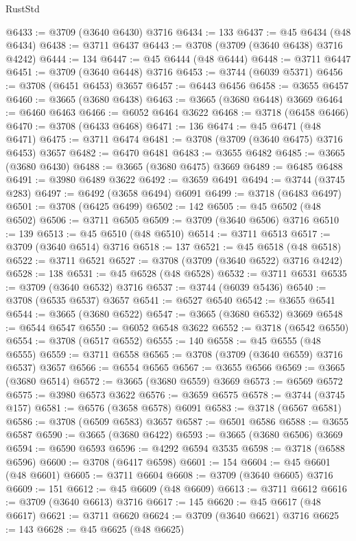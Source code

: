 \begin{lexlean}{RustStd}
\begin{coremodule}
@6433 := @3709 (@3640 @6430) @3716
@6434 := 133
@6437 := @45 @6434 (@48 @6434)
@6438 := @3711 @6437
@6443 := @3708 (@3709 (@3640 @6438) @3716 @4242)
@6444 := 134
@6447 := @45 @6444 (@48 @6444)
@6448 := @3711 @6447
@6451 := @3709 (@3640 @6448) @3716
@6453 := @3744 (@6039 @5371)
@6456 := @3708 (@6451 @6453) @3657
@6457 := @6443 @6456
@6458 := @3655 @6457
@6460 := @3665 (@3680 @6438)
@6463 := @3665 (@3680 @6448) @3669
@6464 := @6460 @6463
@6466 := @6052 @6464 @3622
@6468 := @3718 (@6458 @6466)
@6470 := @3708 (@6433 @6468)
@6471 := 136
@6474 := @45 @6471 (@48 @6471)
@6475 := @3711 @6474
@6481 := @3708 (@3709 (@3640 @6475) @3716 @6453) @3657
@6482 := @6470 @6481
@6483 := @3655 @6482
@6485 := @3665 (@3680 @6430)
@6488 := @3665 (@3680 @6475) @3669
@6489 := @6485 @6488
@6491 := @3980 @6489 @3622
@6492 := @3659 @6491
@6494 := @3744 (@3745 @283)
@6497 := @6492 (@3658 @6494) @6091
@6499 := @3718 (@6483 @6497)
@6501 := @3708 (@6425 @6499)
@6502 := 142
@6505 := @45 @6502 (@48 @6502)
@6506 := @3711 @6505
@6509 := @3709 (@3640 @6506) @3716
@6510 := 139
@6513 := @45 @6510 (@48 @6510)
@6514 := @3711 @6513
@6517 := @3709 (@3640 @6514) @3716
@6518 := 137
@6521 := @45 @6518 (@48 @6518)
@6522 := @3711 @6521
@6527 := @3708 (@3709 (@3640 @6522) @3716 @4242)
@6528 := 138
@6531 := @45 @6528 (@48 @6528)
@6532 := @3711 @6531
@6535 := @3709 (@3640 @6532) @3716
@6537 := @3744 (@6039 @5436)
@6540 := @3708 (@6535 @6537) @3657
@6541 := @6527 @6540
@6542 := @3655 @6541
@6544 := @3665 (@3680 @6522)
@6547 := @3665 (@3680 @6532) @3669
@6548 := @6544 @6547
@6550 := @6052 @6548 @3622
@6552 := @3718 (@6542 @6550)
@6554 := @3708 (@6517 @6552)
@6555 := 140
@6558 := @45 @6555 (@48 @6555)
@6559 := @3711 @6558
@6565 := @3708 (@3709 (@3640 @6559) @3716 @6537) @3657
@6566 := @6554 @6565
@6567 := @3655 @6566
@6569 := @3665 (@3680 @6514)
@6572 := @3665 (@3680 @6559) @3669
@6573 := @6569 @6572
@6575 := @3980 @6573 @3622
@6576 := @3659 @6575
@6578 := @3744 (@3745 @157)
@6581 := @6576 (@3658 @6578) @6091
@6583 := @3718 (@6567 @6581)
@6586 := @3708 (@6509 @6583) @3657
@6587 := @6501 @6586
@6588 := @3655 @6587
@6590 := @3665 (@3680 @6422)
@6593 := @3665 (@3680 @6506) @3669
@6594 := @6590 @6593
@6596 := @4292 @6594 @3535
@6598 := @3718 (@6588 @6596)
@6600 := @3708 (@6417 @6598)
@6601 := 154
@6604 := @45 @6601 (@48 @6601)
@6605 := @3711 @6604
@6608 := @3709 (@3640 @6605) @3716
@6609 := 151
@6612 := @45 @6609 (@48 @6609)
@6613 := @3711 @6612
@6616 := @3709 (@3640 @6613) @3716
@6617 := 145
@6620 := @45 @6617 (@48 @6617)
@6621 := @3711 @6620
@6624 := @3709 (@3640 @6621) @3716
@6625 := 143
@6628 := @45 @6625 (@48 @6625)

\end{coremodule}
\end{lexlean}
